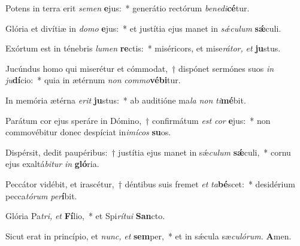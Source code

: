 \item Potens in terra erit \textit{semen} \textbf{e}jus:~* generátio rectórum \textit{benedi}\textbf{cé}tur.
\item Glória et divítiæ in \textit{domo} \textbf{e}jus:~* et justítia ejus manet in \textit{sǽculum} \textbf{sǽ}culi.
\item Exórtum est in ténebris \textit{lumen} \textbf{re}ctis:~* miséricors, et mise\textit{rátor,} \textit{et} \textbf{ju}stus.
\item Jucúndus homo qui miserétur et cómmodat,~† dispónet sermónes suos \textit{in} \textit{ju}\textbf{dí}cio:~* quia in ætérnum \textit{non} \textit{commo}\textbf{vébi}tur.
\item In memória ætérna \textit{erit} \textbf{ju}stus:~* ab auditióne ma\tinyhspace\textit{la} \textit{non} \textit{ti}\textbf{mé}bit.
\item Parátum cor ejus speráre in Dómino,~† confirmátum \textit{est} \textit{cor} \textbf{e}jus:~* non commovébitur donec despíciat in\textit{imícos} \textbf{su}os.
\item Dispérsit, dedit paupéribus:~† justítia ejus manet in sǽ\tinyhspace\textit{culum} \textbf{sǽ}culi,~* cornu ejus exaltá\tinyhspace\textit{bitur} \textit{in} \textbf{gló}ria.
\item Peccátor vidébit, et irascétur,~† déntibus suis fremet \textit{et} \textit{ta}\textbf{bé}scet:~* desidérium pecca\tinyhspace\textit{tórum} \textit{per}\textbf{í}bit.
\item Glória Pa\tinyhspace\textit{tri,} \textit{et} \textbf{Fí}lio,~* et Spi\tinyhspace\textit{rítui} \textbf{San}cto.
\item Sicut erat in princípio, et \textit{nunc,} \textit{et} \textbf{sem}per,~* et in sǽcula sæ\tinyhspace\textit{culórum.} \textbf{A}men.